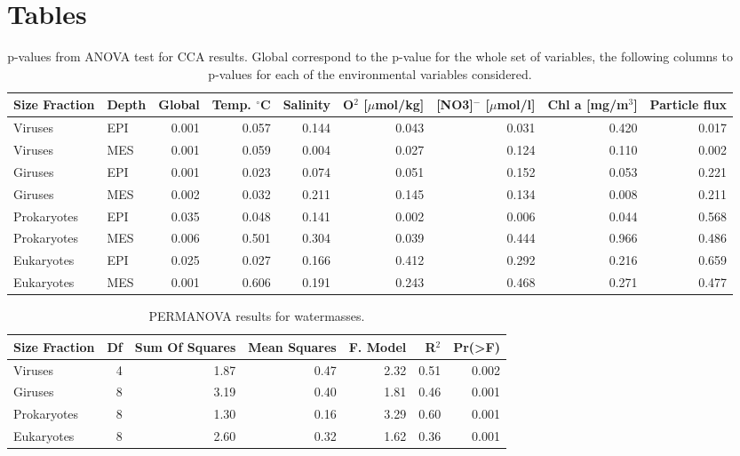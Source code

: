 \documentclass[fleqn,10pt]{wlscirep}
\begin{document}
\section*{Tables}

\begin{table}[ht]
\centering
\begin{tabular}{llrrrrrrr}
\hline
 Size Fraction& Depth & Global & Temp. $^\circ$C & Salinity & O$^2$ [$\mu$mol/kg] &[NO3]$^-$  [$\mu$mol/l]	& Chl a [mg/m$^3$] &	 Particle flux\\
\hline
\hline
Viruses & EPI & 0.001 & 0.057 & 0.144 & 0.043 & 0.031 & 0.420 & 0.017\\
Viruses & MES & 0.001 & 0.059 & 0.004 & 0.027 & 0.124 & 0.110 & 0.002\\
Giruses & EPI & 0.001 & 0.023 & 0.074 & 0.051 & 0.152 & 0.053 & 0.221\\
Giruses & MES & 0.002 & 0.032 & 0.211 & 0.145 & 0.134 & 0.008 & 0.211\\
Prokaryotes & EPI & 0.035 & 0.048 & 0.141 & 0.002 & 0.006 & 0.044 & 0.568\\
Prokaryotes & MES & 0.006 & 0.501 & 0.304 & 0.039 & 0.444 & 0.966 & 0.486\\
Eukaryotes & EPI & 0.025 & 0.027 & 0.166 & 0.412 & 0.292 & 0.216 & 0.659\\
Eukaryotes & MES & 0.001 & 0.606 & 0.191 & 0.243 & 0.468 & 0.271 & 0.477\\
\hline
\hline
\end{tabular}
\caption{\label{tab:CCA} p-values from ANOVA test for CCA results. Global correspond to the p-value for the whole set of variables, the following columns to p-values for each of the environmental variables considered.}
\end{table}

\begin{table}[ht]
\centering
\begin{tabular}{lrrrrrr}
\hline
Size Fraction & Df & Sum Of Squares & Mean Squares & F. Model & R$^2$ & Pr(>F) \\
\hline
\hline
Viruses	& 4	& 1.87 &	0.47 & 2.32 &	0.51 &	0.002\\
Giruses	& 8	& 3.19 &	0.40 & 1.81 &	0.46 &	0.001\\
Prokaryotes & 8	& 1.30 &	0.16 & 3.29 &	0.60 &	0.001\\
Eukaryotes	& 8	& 2.60 &	0.32 & 1.62 &	0.36 &	0.001\\
\hline
\hline
\end{tabular}
\caption{\label{tab:PWM} PERMANOVA results for watermasses.}
\end{table}
\end{document}
